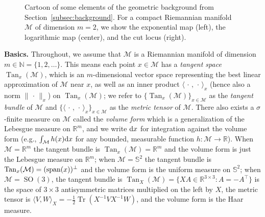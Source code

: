 \documentclass[preprint]{imsart}
\theoremstyle{plain}
\theoremstyle{definition}
\newcommand{\Rbb}{\mathbb{R}}
\newcommand{\Nbb}{\mathbb{N}}
\newcommand{\Mcal}{\mathcal{M}}
\newcommand{\diff}{\textnormal{d}}
\newcommand{\Span}{\textnormal{span}}
\newcommand{\trace}{\operatorname{Tr}}
\DeclareMathOperator{\Tan}{Tan}
\DeclareMathOperator{\SO}{SO}
\begin{document}
\begin{figure}
\begin{center}
	\end{center}
    \caption{Cartoon of some elements of the geometric background from Section~\ref{subsec:background}.
    For a compact Riemannian manifold $\Mcal$ of dimension $m=2$,
    we show the exponential map (left), the logarithmic map (center), and the cut locus (right).}
    \label{fig:background}
\end{figure}

\medskip

\noindent \textbf{Basics.} Throughout, we assume that $\Mcal$ is a Riemannian manifold of dimension $m\in\Nbb=\{1,2,\ldots\}$.
This means each point $x\in\Mcal$ has a \textit{tangent space} $\Tan_x(\Mcal)$, which is an $m$-dimensional vector space representing the best linear approximation of $\Mcal$ near $x$, as well as an inner product $\langle\,\cdot\,,\,\cdot\,\rangle_x$ (hence also a norm $\|\,\cdot\,\|_x$) on $\Tan_x(\Mcal)$; we refer to $\{\Tan_x(\Mcal)\}_{x\in\Mcal}$ as the \textit{tangent bundle} of $\Mcal$ and $\{\langle\,\cdot\,,\,\cdot\,\rangle_x\}_{x\in\Mcal}$ as the \textit{metric tensor} of $\Mcal$.
There also exists a $\sigma$-finite measure on $\Mcal$ called the \textit{volume form} which is a generalization of the Lebesgue measure on $\Rbb^m$, and we write $\diff x$ for integration against the volume form (e.g., $\int_{\Mcal}h(x)\diff x$ for any bounded, measurable function $h:\Mcal\to\Rbb$).
When $\Mcal=\Rbb^m$ the tangent bundle is $\Tan_x(\Mcal) = \Rbb^m$ and the volume form is just the Lebesgue measure on $\Rbb^m$; when $\Mcal=\mathbb{S}^2$ the tangent bundle is $\Tan_x(\Mcal) = (\Span(x))^{\bot}$ and the volume form is the uniform measure on $\mathbb{S}^2$; when $\Mcal=\SO(3)$, the tangent bundle is $\Tan_X(\Mcal) =\{XA\in\Rbb^{3\times 3}:A=-A^{\top}\}$ is the space of $3\times 3$ antisymmetric matrices multiplied on the left by $X$, the metric tensor is $\langle V,W\rangle_X = -\frac{1}{2}\trace(X^{-1}VX^{-1}W)$, and the volume form is the Haar measure.
\end{document}
